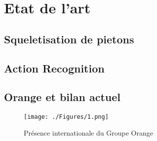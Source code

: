\clearpage
\section{Etat de l'art}

\subsection{Squeletisation de pietons}

\subsection{Action Recognition}



\label{sec:Entreprise}
\subsection{Orange et bilan actuel}
\label{subsec:Intro/table}

\begin{figure}[htbp]
    \texttt{[image: ./Figures/1.png]}
    \caption{Présence internationale du Groupe Orange}
    \label{fig:UoC}
\end{figure}

